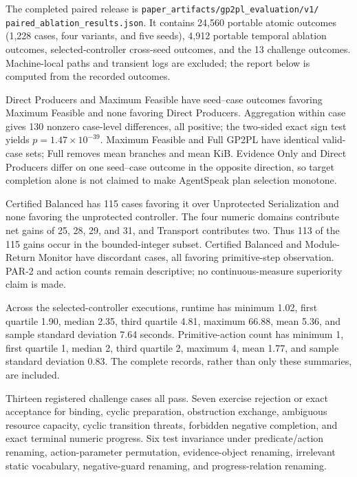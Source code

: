 The completed paired release is
\texttt{paper\_artifacts/gp2pl\_evaluation/v1/}
\texttt{paired\_ablation\_results.json}. It contains 24,560 portable atomic
outcomes (1,228 cases, four variants, and five seeds), 4,912 portable temporal
ablation outcomes, \TemporalCrossSeedEvaluationCount{} selected-controller
cross-seed outcomes, and the 13 challenge outcomes.
Machine-local paths and transient logs are excluded; the report below is
computed from the recorded outcomes.



Direct Producers and Maximum Feasible have
\AtomicDirectToMaximumRightOnlyValidCount{} seed--case outcomes favoring
Maximum Feasible and none favoring Direct Producers. Aggregation within case
gives 130 nonzero case-level differences, all positive; the two-sided exact
sign test yields $p=1.47\times10^{-39}$. Maximum Feasible and Full GP2PL have
identical valid-case sets; Full removes \AtomicFullBranchReduction{} mean
branches and \AtomicFullLibraryKiBReduction{} mean KiB. Evidence Only and
Direct Producers differ on one seed--case outcome in the opposite direction,
so target completion alone is not claimed to make AgentSpeak plan selection
monotone.



Certified Balanced has 115 cases favoring it over Unprotected Serialization and
none favoring the unprotected controller. The four numeric domains contribute
net gains of 25, 28, 29, and 31, and Transport contributes two. Thus 113 of the
115 gains occur in the bounded-integer subset. Certified Balanced and
Module-Return Monitor have
\TemporalBalancedToModuleReturnLeftOnlyValidCount{} discordant cases, all favoring
primitive-step observation. PAR-2 and action counts remain descriptive; no
continuous-measure superiority claim is made.

Across the \TemporalCrossSeedEvaluationCount{} selected-controller executions,
runtime has minimum 1.02, first quartile 1.90, median 2.35, third quartile 4.81,
maximum 66.88, mean 5.36, and sample standard deviation 7.64 seconds.
Primitive-action count has minimum 1, first quartile 1, median 2, third quartile
2, maximum 4, mean 1.77, and sample standard deviation 0.83. The complete
records, rather than only these summaries, are included.

Thirteen registered challenge cases all pass. Seven exercise rejection or exact
acceptance for binding, cyclic preparation, obstruction exchange, ambiguous
resource capacity, cyclic transition threats, forbidden negative completion,
and exact terminal numeric progress. Six test invariance under predicate/action
renaming, action-parameter permutation, evidence-object renaming, irrelevant
static vocabulary, negative-guard renaming, and progress-relation renaming.

